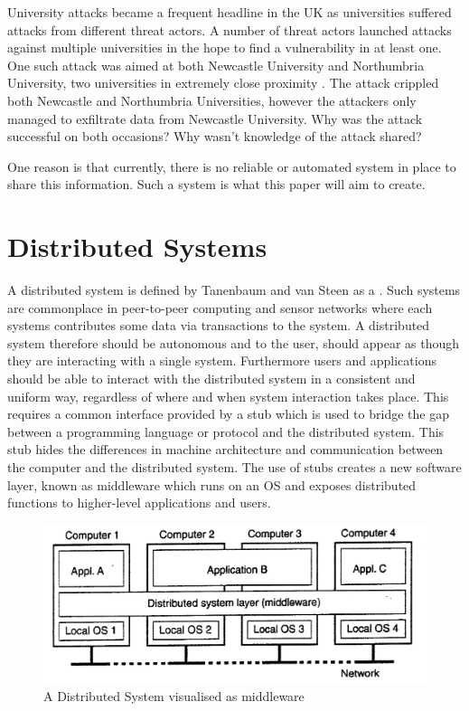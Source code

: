 \documentclass[a4paper, 12pt]{report}
\begin{document}
University attacks became a frequent headline in the UK as universities suffered attacks from different threat actors. A number of threat actors launched attacks against multiple universities in the hope to find a vulnerability in at least one. One such attack was aimed at both Newcastle University and Northumbria University, two universities in extremely close proximity \cite{newhack,norhack}. The attack crippled both Newcastle and Northumbria Universities, however the attackers only managed to exfiltrate data from Newcastle University. Why was the attack successful on both occasions? Why wasn't knowledge of the attack shared? 

One reason is that currently, there is no reliable or automated system in place to share this information. Such a system is what this paper will aim to create. 

\section{Distributed Systems} \label{distributed}
A distributed system is defined by Tanenbaum and van Steen as a  \cite{tanenbaumdist}. Such systems are commonplace in peer-to-peer computing and sensor networks where each systems contributes some data via transactions to the system. A distributed system therefore should be autonomous and to the user, should appear as though they are interacting with a single system. Furthermore users and applications should be able to interact with the distributed system in a consistent and uniform way, regardless of where and when system interaction takes place. This requires a common interface provided by a \gls{stub} which is used to bridge the gap between a programming language or protocol and the distributed system. This \gls{stub} hides the differences in machine architecture and communication between the computer and the distributed system. The use of \gls{stub}s creates a new software layer, known as \gls{middleware} which runs on an \acrfull{OS} and exposes distributed functions to higher-level applications and users.

\begin{center}
	\begin{figure}[!htb]
		\includegraphics[width=\textwidth,keepaspectratio]{TanenbaumDistributed}
		\caption{A Distributed System visualised as \gls{middleware} \cite{tanenbaumdist}} 
		\label{fig:middleware}
	\end{figure}
\end{center}
\end{document}
